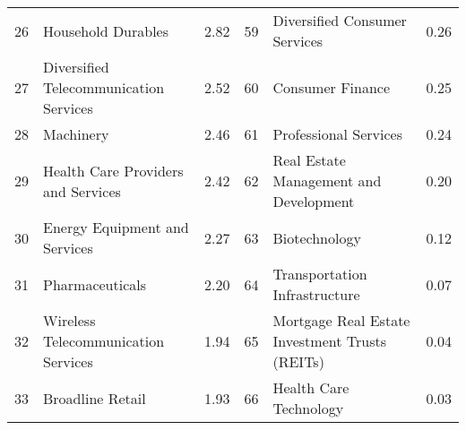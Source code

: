 \begin{tabular}{rlrrlr}
   26 &                                 Household Durables &                2.82 &    59 &                    Diversified Consumer Services &                0.26 \\
   27 &             Diversified Telecommunication Services &                2.52 &    60 &                                 Consumer Finance &                0.25 \\
   28 &                                          Machinery &                2.46 &    61 &                            Professional Services &                0.24 \\
   29 &                 Health Care Providers and Services &                2.42 &    62 &           Real Estate Management and Development &                0.20 \\
   30 &                      Energy Equipment and Services &                2.27 &    63 &                                    Biotechnology &                0.12 \\
   31 &                                    Pharmaceuticals &                2.20 &    64 &                    Transportation Infrastructure &                0.07 \\
   32 &                Wireless Telecommunication Services &                1.94 &    65 &   Mortgage Real Estate Investment Trusts (REITs) &                0.04 \\
   33 &                                   Broadline Retail &                1.93 &    66 &                           Health Care Technology &                0.03 \\
\bottomrule
\end{tabular}
